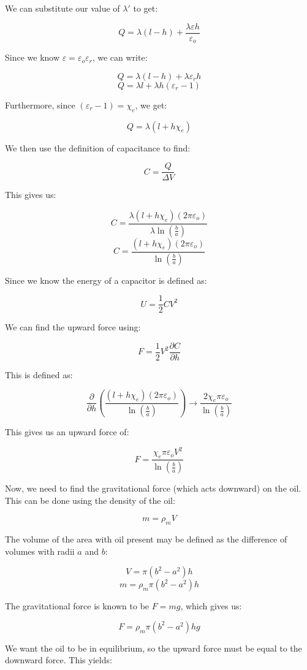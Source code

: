 \begin{enumerate}
    We can substitute our value of $\lambda\prime$ to get:

    $$Q=\lambda(l-h)+\frac{\lambda\varepsilon h}{\varepsilon_o}$$

    Since we know $\varepsilon=\varepsilon_o\varepsilon_r$, we can write:

    $$Q=\lambda(l-h)+\lambda\varepsilon_r h$$
    $$Q=\lambda l+\lambda h(\varepsilon_r-1)$$

    Furthermore, since $(\varepsilon_r-1)=\chi_e$, we get:

    $$Q=\lambda (l+h\chi_e)$$

    We then use the definition of capacitance to find:

    $$C=\frac{Q}{\Delta V}$$

    This gives us:

    $$C=\frac{\lambda(l+h\chi_e)(2\pi\varepsilon_o)}{\lambda\ln\left( \frac{b}{a} \right)}$$
    $$C=\frac{(l+h\chi_e)(2\pi\varepsilon_o)}{\ln\left( \frac{b}{a} \right)}$$

    Since we know the energy of a capacitor is defined as:

    $$U=\frac{1}{2}CV^2$$

    We can find the upward force using:

    $$F=\frac{1}{2}V^2\frac{\partial C}{\partial h}$$

    This is defined as:

    $$\frac{\partial}{\partial h}\left( \frac{(l+h\chi_e)(2\pi\varepsilon_o)}{\ln\left( \frac{b}{a} \right)} \right)\to\frac{2\chi_e\pi\varepsilon_o}{\ln\left( \frac{b}{a} \right)}$$

    This gives us an upward force of:

    $$F=\frac{\chi_e\pi\varepsilon_oV^2}{\ln\left( \frac{b}{a} \right)}$$

    Now, we need to find the gravitational force (which acts downward) on the oil. This can be done using the density of the oil:

    $$m=\rho_mV$$

    The volume of the area with oil present may be defined as the difference of volumes with radii $a$ and $b$:

    $$V=\pi(b^2-a^2)h$$
    $$m=\rho_m\pi\left( b^2-a^2 \right)h$$

    The gravitational force is known to be $F=mg$, which gives us:

    $$F=\rho_m\pi\left( b^2-a^2 \right)hg$$

    We want the oil to be in equilibrium, so the upward force must be equal to the downward force. This yields:


\end{enumerate}
